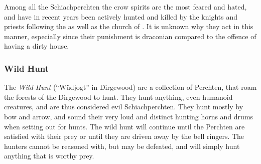 Among all the Schiachperchten the crow spirits are the most feared and hated,
and have in recent years been actively hunted and killed by the knights and
priests following the  as well as the church of
. It is unknown why they act in this manner, especially since
their punishment is draconian compared to the offence of having a dirty house.

\subsubsection{Wild Hunt}
\label{sec:Wild Hunt}

The \emph{Wild Hunt} (``Wüdjogt'' in Dirgewood) are a collection of Perchten,
that roam the forests of the Dirgewood to hunt. They hunt anything, even
humanoid creatures, and are thus considered evil Schiachperchten. They hunt
mostly by bow and arrow, and sound their very loud and distinct hunting horns
and drums when setting out for hunts. The wild hunt will continue until the
Perchten are satisfied with their prey or until they are driven away by the
bell ringers. The hunters cannot be reasoned with, but may be defeated, and
will simply hunt anything that is worthy prey.
